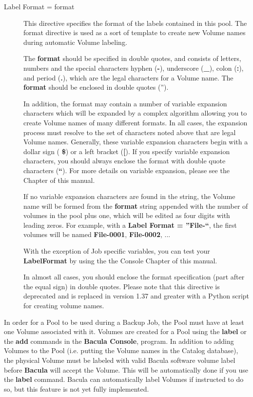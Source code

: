 \begin{description}
\item [Label Format = \lt{}format\gt{}]
   This directive specifies the  format of the labels contained in this pool. The
format directive  is used as a sort of template to create new Volume names
during  automatic Volume labeling.  

The {\bf format} should be specified in double quotes, and  consists of
letters, numbers and the special characters  hyphen ({\bf -}), underscore
({\bf \_}), colon ({\bf :}), and  period ({\bf .}), which are the legal
characters for a Volume  name. The {\bf format} should be enclosed in  double
quotes ('').  

In addition, the format may contain a number of variable expansion  characters
which will be expanded by a complex algorithm allowing  you to create Volume
names of many different formats. In all  cases, the expansion process must
resolve to the set of characters  noted above that are legal Volume names.
Generally, these  variable expansion characters begin with a dollar sign ({\bf
\$})  or a left bracket ({\bf [}). If you specify variable expansion 
characters, you should always enclose the format with double  quote characters
({\bf ``}). For more details on variable expansion,  please see the 
 Chapter of  this manual.  

If no variable expansion characters are found in the string,  the Volume name
will be formed from the {\bf format} string  appended with the number of
volumes in the pool plus one, which  will be edited as four digits with
leading zeros. For example,  with a {\bf Label Format = ''File-``}, the first
volumes will be  named {\bf File-0001}, {\bf File-0002}, ...  

With the exception of Job specific variables, you can test  your {\bf
LabelFormat} by using the 
 the Console Chapter of this manual.  

In almost all cases, you should enclose the format specification  (part after
the equal sign) in double quotes.  Please note that this directive is
deprecated and is replaced in version 1.37 and greater with a Python script
for creating volume names.

\end{description}

In order for a Pool to be used during a Backup Job, the Pool must have at
least one Volume associated with it. Volumes are created for a Pool using the
{\bf label} or the {\bf add} commands in the {\bf Bacula Console}, program. In
addition to adding Volumes to the Pool (i.e. putting the Volume names in the
Catalog database), the physical Volume must be labeled with valid Bacula
software volume label before {\bf Bacula} will accept the Volume. This will be
automatically done if you use the {\bf label} command. Bacula can
automatically label Volumes if instructed to do so, but this feature is not
yet fully implemented. 

